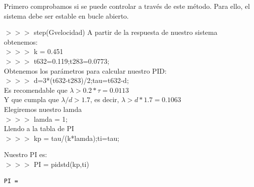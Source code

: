 \begin{tcolorbox}[sharp corners, colframe=bluebox, title= Controlador Rivera-Morari, breakable=unlimited]
Primero comprobamos si se puede controlar a través de este método. Para ello, 
el sistema debe ser estable en bucle abierto.

 $>>>$ step(Gvelocidad)
A partir de la respuesta de nuestro sistema obtenemos:\\
$>>>$ k = 0.451\\
$>>>$ t632=0.119;t283=0.0773;\\

Obtenemos los parámetros para calcular nuestro PID:\\
$>>>$ d=3*(t632-t283)/2;tau=t632-d;\\
Es recomendable que $\lambda > 0.2*\tau=0.0113$\\
Y que cumpla que $\lambda/d > 1.7$, es decir, $\lambda > d*1.7 = 0.1063$\\
Elegiremos nuestro lamda\\
$>>>$ lamda = 1;\\
Llendo a la tabla de PI\\
$>>>$ kp = tau/(k*lamda);ti=tau;

Nuestro PI es:\\
$>>>$ PI = pidstd(kp,ti)
  \vspace*{0.5em}
  \begin{tcolorbox}[sharp corners, colback = white]
    \color{gray}
\begin{verbatim}
PI =
 

\end{verbatim}
\end{tcolorbox}
\end{tcolorbox}
